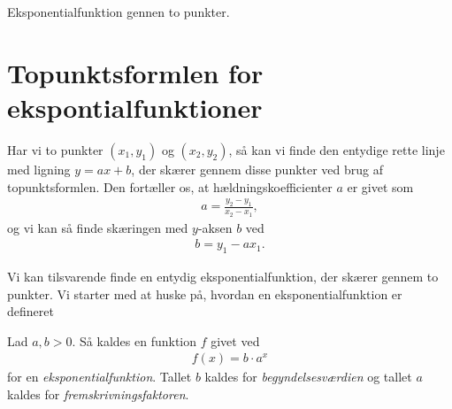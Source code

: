 
\begin{center}
\Huge
Eksponentialfunktion gennen to punkter. 
\end{center}
\section*{Topunktsformlen for ekspontialfunktioner}
Har vi to punkter $(x_1,y_1)$ og $(x_2,y_2)$, så kan vi finde den entydige rette linje med ligning $y = ax + b$, der skærer gennem disse punkter ved brug af topunktsformlen. Den fortæller os, at hældningskoefficienter $a$ er givet som
\begin{align*}
a = \frac{y_2-y_1}{x_2-x_1},
\end{align*}
og vi kan så finde skæringen med $y$-aksen $b$ ved
\begin{align*}
b = y_1 - ax_1.
\end{align*}

Vi kan tilsvarende finde en entydig eksponentialfunktion, der skærer gennem to punkter.
Vi starter med at huske på, hvordan en eksponentialfunktion er defineret
\begin{defn}[Eksponentialfunktion]
	Lad $a,b>0$. Så kaldes en funktion $f$ givet ved
	\begin{align*}
		f(x)=b\cdot a^x
	\end{align*}
	for en \textit{eksponentialfunktion}. Tallet $b$ kaldes for \textit{begyndelsesværdien} og tallet $a$ kaldes for \textit{fremskrivningsfaktoren}.
\end{defn}

